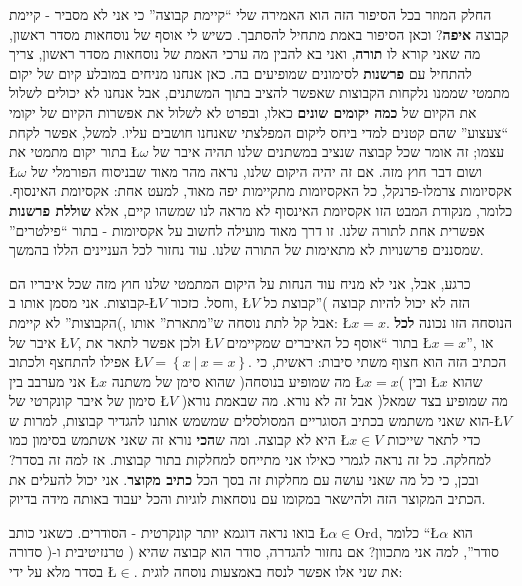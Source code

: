 \documentclass[english,hebrew]{article}
\begin{document}
החלק המוזר בכל הסיפור הזה הוא האמירה שלי \textquotedblleft קיימת קבוצה\textquotedblright{}
כי אני לא מסביר - קיימת קבוצה \textbf{איפה}? וכאן הסיפור באמת מתחיל
להסתבך. כשיש לי אוסף של נוסחאות מסדר ראשון, מה שאני קורא לו \textbf{תורה},
ואני בא להבין מה ערכי האמת של נוסחאות מסדר ראשון, צריך להתחיל עם \textbf{פרשנות}
לסימונים שמופיעים בה. כאן אנחנו מניחים במובלע קיום של יקום מתמטי שממנו
נלקחות הקבוצות שאפשר להציב בתוך המשתנים, אבל אנחנו לא יכולים לשלול
את הקיום של \textbf{כמה יקומים שונים} כאלו, ובפרט לא לשלול את אפשרות
הקיום של יקומי \textquotedblleft צעצוע\textquotedblright{} שהם קטנים
למדי ביחס ליקום המפלצתי שאנחנו חושבים עליו. למשל, אפשר לקחת בתור יקום
מתמטי את \L{$\omega$} עצמו; זה אומר שכל קבוצה שנציב במשתנים שלנו
תהיה איבר של \L{$\omega$} ושום דבר חוץ מזה. אם זה יהיה היקום שלנו,
נראה מהר מאוד שבניסוח הפורמלי של אקסיומות צרמלו-פרנקל, כל האקסיומות
מתקיימות יפה מאוד, למעט אחת: אקסיומת האינסוף. כלומר, מנקודת המבט הזו
אקסיומת האינסוף לא מראה לנו שמשהו קיים, אלא \textbf{שוללת פרשנות}
אפשרית אחת לתורה שלנו. זו דרך מאוד מועילה לחשוב על אקסיומות - בתור
\textquotedblleft פילטרים\textquotedblright{} שמסננים פרשנויות לא מתאימות
של התורה שלנו. עוד נחזור לכל העניינים הללו בהמשך.

כרגע, אבל, אני לא מניח עוד הנחות על היקום המתמטי שלנו חוץ מזה שכל
איבריו הם קבוצות. אני מסמן אותו ב-\L{$V$} וחסל. כזכור, \L{$V$} הזה
לא יכול להיות קבוצה )\textquotedblright קבוצת כל הקבוצות\textquotedblright{}
לא קיימת(, אבל קל לתת נוסחה ש\textquotedblright מתארת\textquotedblright{}
אותו: \L{$x=x$}. הנוסחה הזו נכונה \textbf{לכל} איבר של \L{$V$},
ולכן אפשר לתאר את \L{$V$} בתור \textquotedblleft אוסף כל האיברים
שמקיימים \L{$x=x$}\textquotedblright , או אפילו להתחצף ולכתוב \L{$V=\left\{ x\ |\ x=x\right\} $}.
הכתיב הזה הוא חצוף משתי סיבות: ראשית, כי אני מערבב בין \L{$x$} שהוא
סימן של משתנה )מה שמופיע בנוסחה \L{$x=x$}( ובין \L{$x$} שהוא סימון
של איבר קונקרטי של \L{$V$} )מה שמופיע בצד שמאל( אבל זה לא נורא. מה
שבאמת נורא הוא שאני משתמש בכתיב הסוגריים המסולסלים שמשמש אותנו להגדיר
קבוצות, למרות ש-\L{$V$} היא לא קבוצה. ומה ש\textbf{הכי} נורא זה שאני
אשתמש בסימון כמו \L{$x\in V$} כדי לתאר שייכות למחלקה. כל זה נראה
לגמרי כאילו אני מתייחס למחלקות בתור קבוצות. אז למה זה בסדר? ובכן,
כי כל מה שאני עושה עם מחלקות זה בסך הכל \textbf{כתיב מקוצר}. אני יכול
להעלים את הכתיב המקוצר הזה ולהישאר במקומו עם נוסחאות לוגיות והכל יעבוד
באותה מידה בדיוק.

בואו נראה דוגמא יותר קונקרטית - הסודרים. כשאני כותב \L{$\alpha\in\text{Ord}$},
כלומר \textquotedblleft\L{$\alpha$} הוא סודר\textquotedblright ,
למה אני מתכוון? אם נחזור להגדרה, סודר הוא קבוצה שהיא {\endL}(
טרנזיטיבית ו-{\endL}( סדורה בסדר מלא על ידי \L{$\in$}. את
שני אלו אפשר לנסח באמצעות נוסחה לוגית:
\end{document}
